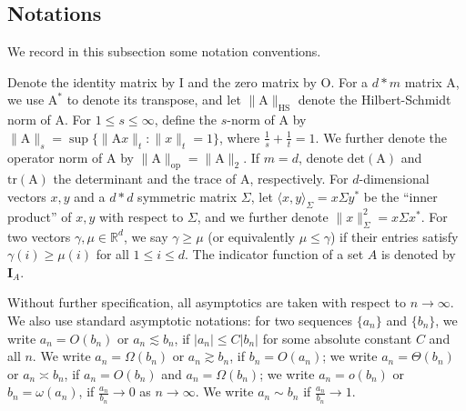 \documentclass[11pt]{article}
\numberwithin{equation}{section}
\begin{document}
 
\subsection{Notations}
We record in this subsection some notation conventions.

Denote the identity matrix by $\mathrm{I}$ and the zero matrix by $\mathrm{O}$. For a $d*m$ matrix $\mathrm{A}$, we use $\mathrm{A}^{*}$ to denote its transpose, and let $\| \mathrm{A} \|_{\mathrm{HS}}$ denote the Hilbert-Schmidt norm of $\mathrm{A}$. For $1 \leq s \leq \infty$, define the $s$-norm of $\mathrm{A}$ by $\|\mathrm{A}\|_{s} = \sup \{ \|\mathrm{A}x\|_{t}: \|x\|_{t} =1 \}$, where $\frac{1}{s}+\frac{1}{t}=1$. We further denote the operator norm of $\mathrm{A}$ by $\|\mathrm{A}\|_{\mathrm{op}} = \|\mathrm{A}\|_2$. If $m=d$, denote $\mathrm{det(A)}$ and $\mathrm{tr(A)}$ the determinant and the trace of $\mathrm{A}$, respectively. For $d$-dimensional vectors $x,y$ and a $d*d$ symmetric matrix $\Sigma$, let $\langle x,y \rangle_{\Sigma} = x \Sigma y^{*}$ be the ``inner product'' of $x,y$ with respect to $\Sigma$, and we further denote $\| x \|_{\Sigma}^2 = x \Sigma x^{*}$. For two vectors $\gamma,\mu \in \mathbb{R}^d$, we say $\gamma \geq \mu$ (or equivalently $\mu \leq \gamma$) if their entries satisfy $\gamma(i) \geq \mu(i)$ for all $1 \leq i \leq d$. The indicator function of a set $A$ is denoted by $\mathbf{I}_{A}$.

Without further specification, all asymptotics are taken with respect to $n \to \infty$. We also use standard asymptotic notations: for two sequences $\{ a_n \}$ and $\{ b_n \}$, we write $a_n = O(b_n)$ or $a_n \lesssim b_n$, if $|a_n| \leq C |b_n|$ for some absolute constant $C$ and all $n$. We write $a_n = \Omega(b_n)$ or $a_n \gtrsim b_n$, if $b_n = O(a_n)$; we write $a_n = \Theta(b_n)$ or $a_n \asymp b_n$, if $a_n = O(b_n)$ and $a_n = \Omega(b_n)$; we write $a_n = o(b_n)$ or $b_n = \omega(a_n)$, if $\frac{a_n}{b_n} \to 0$ as $n \to \infty$. We write $a_n \sim b_n$ if $\frac{a_n}{b_n} \to 1$.
\end{document}
